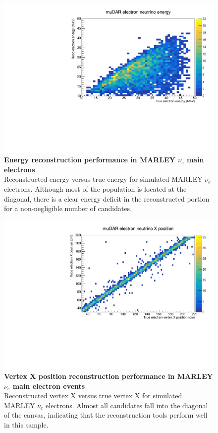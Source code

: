 \begin{figure}[h!]
    \centering
    \includegraphics[width=120mm]{Figures/energy_reco_vs_true.pdf}
    \caption[Energy reconstruction performance in MARLEY $\nu_e$ main electron events]{{\textbf{Energy reconstruction performance in MARLEY $\nu_e$ main electrons}}\\ Reconstructed energy versus true energy for simulated MARLEY $\nu_e$ electrons. Although most of the population is located at the diagonal, there is a clear energy deficit in the reconstructed portion for a non-negligible number of candidates.}
    \label{reco_vs_true_energy}
\end{figure}

\begin{figure}[h!]
    \centering
    \includegraphics[width=120mm]{Figures/x_reco_vs_true.pdf}
    \caption[Vertex X position reconstruction performance in MARLEY $\nu_e$ main electron events]{{\textbf{Vertex X position reconstruction performance in MARLEY $\nu_e$ main electron events}}\\ Reconstructed vertex X versus true vertex X for simulated MARLEY $\nu_e$ electrons. Almost all candidates fall into the diagonal of the canvas, indicating that the reconstruction tools perform well in this sample.}
    \label{reco_vs_true_vertex_x}
\end{figure}

